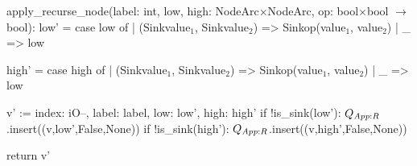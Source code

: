 \begin{blstlisting}
  apply_recurse_node(label: int,
                     low, high: NodeArc$\times$NodeArc,
                     op: bool$\times$bool $\rightarrow$ bool):
        low' = case low of
               | (Sink{value$_1$}, Sink{value$_2$}) => Sink{op(value$_1$, value$_2$)}
               | _ => low

        high' = case high of
                | (Sink{value$_1$}, Sink{value$_2$}) => Sink{op(value$_1$, value$_2$)}
                | _ => low

         v' := { index: iO--, label: label, low: low', high: high' }
         if !is_sink(low'): $\ApplyQrec$.insert((v,low',False,None))
         if !is_sink(high'): $\ApplyQrec$.insert((v,high',False,None))

         return v'
\end{blstlisting}

